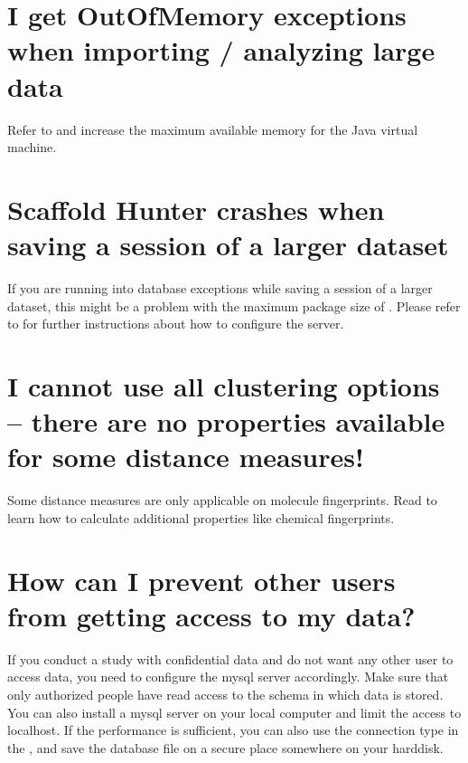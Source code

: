 \section{I get OutOfMemory exceptions when importing / analyzing large data}
Refer to  and increase the maximum available memory for the Java virtual machine.

\section{Scaffold Hunter crashes when saving a session of a larger dataset}
If you are running into database exceptions while saving a session of a larger dataset, this might be a problem with the maximum package size of \mysql. Please refer to  for further instructions about how to configure the \mysql server.

\section{I cannot use all clustering options -- there are no properties available for some distance measures!}
  Some distance measures are only applicable on molecule fingerprints.
  Read  to learn how to calculate additional properties like chemical fingerprints.

\section{How can I prevent other users from getting access to my data?}
  If you conduct a study with confidential data and do not want any other user to access \shs data, you need to configure the mysql server accordingly. Make sure that only authorized people have read access to the schema in which \shs data is stored. You can also install a mysql server on your local computer and limit the access to localhost.
  If the performance is sufficient, you can also use the connection type \hsqldb in the , and save the database file on a secure place somewhere on your harddisk.

